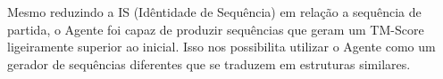 Mesmo reduzindo a IS (Idêntidade de Sequência) em relação a sequência de partida, o Agente foi capaz de produzir sequências que geram um TM-Score ligeiramente superior ao inicial. Isso nos possibilita utilizar o Agente como um gerador de sequências diferentes que se traduzem em estruturas similares.
 